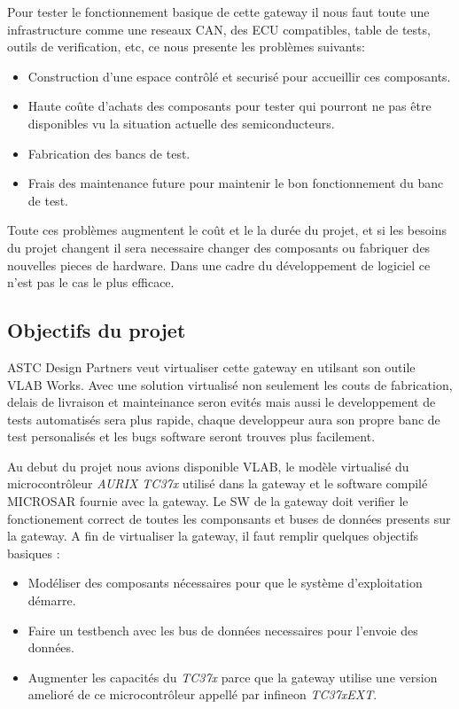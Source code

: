 Pour tester le fonctionnement basique de cette gateway il nous faut toute une infrastructure comme une reseaux CAN, des ECU compatibles, table de tests, outils de verification, etc, ce nous presente les probl\`emes suivants:
\begin{itemize}
    \item Construction d'une espace contr\^ol\'e et securis\'e pour accueillir ces composants.
    \item Haute coûte d'achats des composants pour tester qui pourront ne pas être disponibles vu la situation actuelle des semiconducteurs.
    \item Fabrication des bancs de test.
    \item Frais des maintenance future pour maintenir le bon fonctionnement du banc de test.  
\end{itemize}

Toute ces probl\`emes augmentent le co\^ut et le la dur\'ee du projet, et si les besoins du projet changent il sera necessaire changer des composants ou fabriquer des nouvelles pieces de hardware. Dans une cadre du développement de logiciel ce n'est pas le cas le plus efficace.

\subsection{Objectifs du projet}

ASTC Design Partners veut virtualiser cette gateway en utilsant son outile VLAB Works. Avec une solution virtualis\'e non seulement les couts de fabrication, delais de livraison et mainteinance seron evit\'es mais aussi le developpement de tests automatis\'es sera plus rapide, chaque developpeur aura son propre banc de test personalis\'es et les bugs software seront trouves plus facilement. 


Au debut du projet nous avions disponible VLAB, le mod\`ele virtualis\'e du microcontr\^oleur \textit{AURIX TC37x} utilis\'e dans la gateway et le software compil\'e MICROSAR fournie avec la gateway. Le SW de la gateway doit verifier le fonctionement correct de toutes les componsants et buses de donn\'ees presents sur la gateway. A fin de virtualiser la gateway, il faut remplir quelques objectifs basiques : 
\begin{itemize}
    \item Modéliser des composants nécessaires pour que le syst\`eme d'exploitation démarre.
    \item Faire un testbench avec les bus de donn\'ees necessaires pour l'envoie des donn\'ees.
    \item Augmenter les capacit\'es du \textit{TC37x} parce que la gateway utilise une version amelior\'e de ce microcontr\^oleur appell\'e par infineon \textit{TC37xEXT}.
\end{itemize}